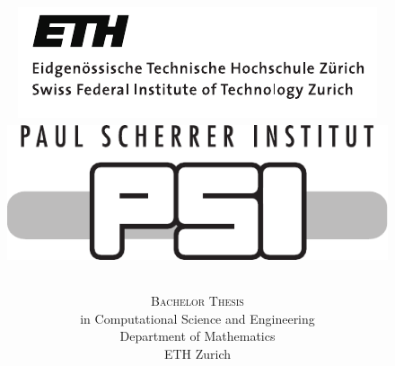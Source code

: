 \documentclass[10pt]{report}
\begin{document}
\begin{titlepage}
    \title{
        \begin{figure}
            \includegraphics[scale=0.65]{pictures/ethlogo_full}
            \hfill
            \includegraphics[scale=0.4]{pictures/psi_logo_gray}
        \end{figure}\vspace*{-5cm}
        \FloatBarrier\parindent 0pt
        \bfseries {\huge {}}
        }
    \author{
        \textsc{{{\LARGE Bachelor Thesis}}} \\[5pt]
        \small in Computational Science and Engineering \\[5pt]
        \small Department of Mathematics \\[5pt] \small ETH Zurich \vspace{0.4cm} \\[0.2in]
}
\end{titlepage}
\end{document}
